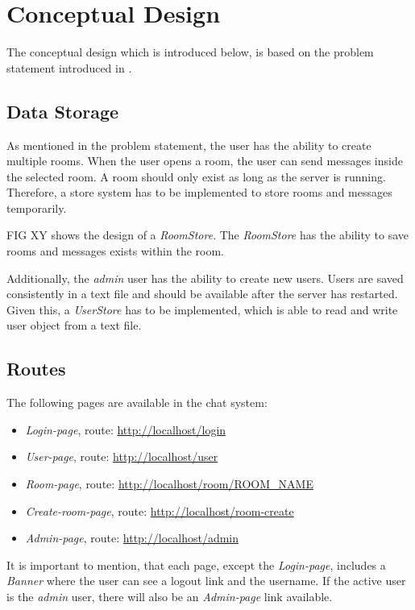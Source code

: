 \section{Conceptual Design}\label{sec:02_design}
The conceptual design which is introduced below, is based on the problem statement introduced in .


\subsection{Data Storage}\label{subsec:02_design_datastorage}
As mentioned in the problem statement, the user has the ability to create multiple rooms. When the user opens a room, the user can send messages inside the selected room. A room should only exist as long as the server is running. Therefore, a store system has to be implemented to store rooms and messages temporarily.

FIG XY shows the design of a \textit{RoomStore}. The \textit{RoomStore} has the ability to save rooms and messages exists within the room.


Additionally, the \textit{admin} user has the ability to create new users. Users are saved consistently in a text file and should be available after the server has restarted.
Given this, a \textit{UserStore} has to be implemented, which is able to read and write user object from a text file.


\subsection{Routes}\label{subsec:02_design_routes}
The following pages are available in the chat system:
\begin{itemize}
\item \textit{Login-page}, route: \url{http://localhost/login}
\item \textit{User-page}, route: \url{http://localhost/user}
\item \textit{Room-page}, route: \url{http://localhost/room/ROOM_NAME}
\item \textit{Create-room-page}, route: \url{http://localhost/room-create}
\item \textit{Admin-page}, route: \url{http://localhost/admin}
\end{itemize}

It is important to mention, that each page, except the \textit{Login-page}, includes a \textit{Banner} where the user can see a logout link and the username. If the active user is the \textit{admin} user, there will also be an \textit{Admin-page} link available.

